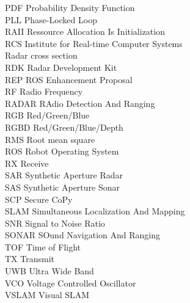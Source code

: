 \begin{listofabbrevs}
\begin{tabbing}
PDF \> Probability Density Function \\
PLL \> Phase-Locked Loop \\
RAII \> Ressource Allocation Is Initialization \\
RCS \> Institute for Real-time Computer Systems \\
   	\> Radar cross section \\
RDK \> Radar Development Kit \\
REP \> ROS Enhancement Proposal \\
RF \> Radio Frequency \\
RADAR \> RAdio Detection And Ranging \\
RGB \> Red/Green/Blue \\
RGBD \> Red/Green/Blue/Depth \\
RMS \> Root mean square \\
ROS \> Robot Operating System \\
RX \> Receive \\
SAR \> Synthetic Aperture Radar \\
SAS \> Synthetic Aperture Sonar \\
SCP \> Secure CoPy \\
SLAM \> Simultaneous Localization And Mapping \\
SNR \> Signal to Noise Ratio \\
SONAR \> SOund Navigation And Ranging \\
TOF \> Time of Flight \\
TX \> Transmit \\
UWB \> Ultra Wide Band \\
VCO \> Voltage Controlled Oscillator \\
VSLAM \> Visual SLAM \\

\end{tabbing}
\end{listofabbrevs}

